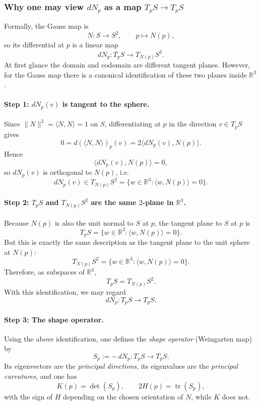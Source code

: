 \documentclass[12pt,a4paper]{article}
\theoremstyle{plain}
\theoremstyle{definition}      %
\begin{document}
	\subsubsection*{Why one may view $dN_p$ as a map $T_pS\to T_pS$}
	
	Formally, the Gauss map is
	\[
	N:S\to S^2,\qquad p\mapsto N(p),
	\]
	so its differential at $p$ is a linear map
	\[
	dN_p:T_pS\longrightarrow T_{N(p)}S^2.
	\]
	At first glance the domain and codomain are different tangent planes. However, for the Gauss map
	there is a canonical identification of these two planes inside $\mathbb R^3$.
	
	\paragraph{Step 1: $dN_p(v)$ is tangent to the sphere.}
	Since $\|N\|^2=\langle N,N\rangle=1$ on $S$, differentiating at $p$ in the direction $v\in T_pS$
	gives
	\[
	0=d(\langle N,N\rangle)_p(v)=2\langle dN_p(v),N(p)\rangle.
	\]
	Hence
	\[
	\langle dN_p(v),N(p)\rangle=0,
	\]
	so $dN_p(v)$ is orthogonal to $N(p)$, i.e.
	\[
	dN_p(v)\in T_{N(p)}S^2=\{w\in\mathbb R^3:\langle w,N(p)\rangle=0\}.
	\]
	
	\paragraph{Step 2: $T_pS$ and $T_{N(p)}S^2$ are the same $2$-plane in $\mathbb R^3$.}
	Because $N(p)$ is also the unit normal to $S$ at $p$, the tangent plane to $S$ at $p$ is
	\[
	T_pS=\{w\in\mathbb R^3:\langle w,N(p)\rangle=0\}.
	\]
	But this is exactly the same description as the tangent plane to the unit sphere at $N(p)$:
	\[
	T_{N(p)}S^2=\{w\in\mathbb R^3:\langle w,N(p)\rangle=0\}.
	\]
	Therefore, as subspaces of $\mathbb R^3$,
	\[
	T_pS = T_{N(p)}S^2.
	\]
	With this identification, we may regard
	\[
	dN_p:T_pS\to T_pS.
	\]
	
	\paragraph{Step 3: The shape operator.}
	Using the above identification, one defines the \emph{shape operator} (Weingarten map) by
	\[
	S_p:=-\,dN_p:T_pS\to T_pS.
	\]
	Its eigenvectors are the \emph{principal directions}, its eigenvalues are the \emph{principal curvatures},
	and one has
	\[
	K(p)=\det(S_p),\qquad 2H(p)=\operatorname{tr}(S_p),
	\]
	with the sign of $H$ depending on the chosen orientation of $N$, while $K$ does not.
	
\end{document}
